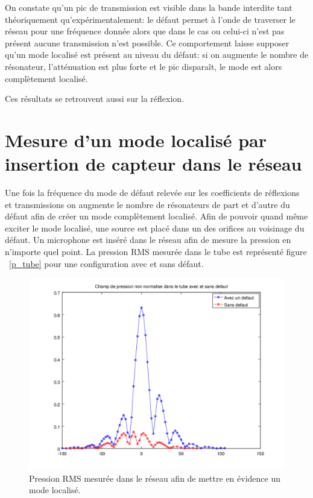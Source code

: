On constate qu'un pic de transmission est visible dans la bande interdite tant théoriquement qu'expérimentalement: le défaut permet à l'onde de traverser le réseau pour une fréquence donnée alors que dans le cas ou celui-ci n'est pas présent aucune transmission n'est possible. Ce comportement laisse supposer qu'un mode localisé est présent au niveau du défaut: si on augmente le nombre de résonateur, l'atténuation est plus forte et le pic disparaît, le mode est alors complètement localisé.

Ces résultats se retrouvent aussi sur la réflexion.
%

\section{Mesure d'un mode localisé par insertion de capteur dans le réseau}
Une fois la fréquence du mode de défaut relevée sur les coefficients de réflexions et transmissions on augmente le nombre de résonateurs de part et d'autre du défaut afin de créer un mode complètement localisé. Afin de pouvoir quand même exciter le mode localisé, une source est placé dans un des orifices au voisinage du défaut. Un microphone est inséré dans le réseau afin de mesure la pression en n'importe quel point. La pression RMS mesurée dans le tube est représenté figure ~\ref{p_tube} pour une configuration avec et sans défaut.

\begin{figure}[!h]
\centering
\includegraphics[scale=0.5]{./images_chp3/non_norm_lin.png}
\caption{\label{_tube} Pression RMS mesurée dans le réseau afin de mettre en évidence un mode localisé.}
\end{figure}

